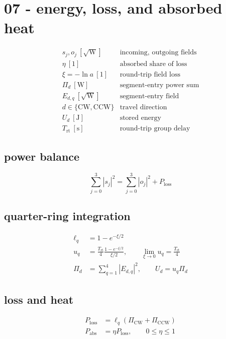 \section*{07 - energy, loss, and absorbed heat}

\[
\begin{array}{ll}s_j,o_j\ [\sqrt{\mathrm W}]&\text{incoming, outgoing fields}\\[0.6em]\eta\ [1]&\text{absorbed share of loss}\\[0.6em]\xi=-\ln a\ [1]&\text{round-trip field loss}\\[0.6em]\Pi_d\ [\mathrm W]&\text{segment-entry power sum}\\[0.6em]E_{d,q}\ [\sqrt{\mathrm W}]&\text{segment-entry field}\\[0.6em]d\in\{\mathrm{CW},\mathrm{CCW}\}&\text{travel direction}\\[0.6em]U_d\ [\mathrm J]&\text{stored energy}\\[0.6em]T_{\mathrm{rt}}\ [\mathrm s]&\text{round-trip group delay}\end{array}
\]

\subsection*{power balance}
\[
\displaystyle \sum_{j=0}^{3}|s_j|^2=\sum_{j=0}^{3}|o_j|^2+P_{\mathrm{loss}}
\]

\subsection*{quarter-ring integration}
\[
\displaystyle \begin{aligned}\ell_q&=1-e^{-\xi/2}\\u_q&=\frac{T_{\mathrm{rt}}}{4}\frac{1-e^{-\xi/2}}{\xi/2},\qquad\lim_{\xi\to0}u_q=\frac{T_{\mathrm{rt}}}{4}\\\Pi_d&=\sum_{q=1}^{4}|E_{d,q}|^2,\qquad U_d=u_q\Pi_d\end{aligned}
\]

\subsection*{loss and heat}
\[
\displaystyle \begin{aligned}P_{\mathrm{loss}}&=\ell_q(\Pi_{\mathrm{CW}}+\Pi_{\mathrm{CCW}})\\P_{\mathrm{abs}}&=\eta P_{\mathrm{loss}},\qquad0\le\eta\le1\end{aligned}
\]
